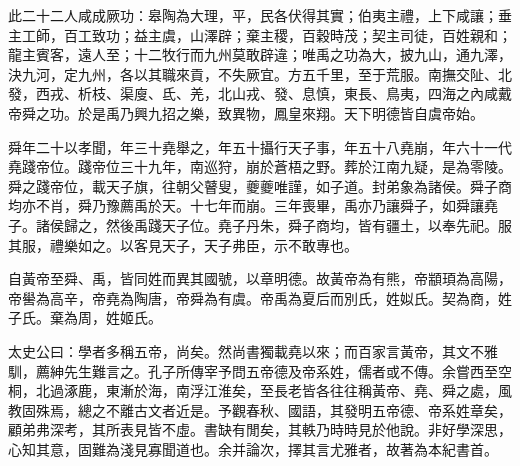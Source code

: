 \begin{pinyinscope}
此二十二人咸成厥功：皋陶為大理，平，民各伏得其實；伯夷主禮，上下咸讓；垂主工師，百工致功；益主虞，山澤辟；棄主稷，百穀時茂；契主司徒，百姓親和；龍主賓客，遠人至；十二牧行而九州莫敢辟違；唯禹之功為大，披九山，通九澤，決九河，定九州，各以其職來貢，不失厥宜。方五千里，至于荒服。南撫交阯、北發，西戎、析枝、渠廋、氐、羌，北山戎、發、息慎，東長、鳥夷，四海之內咸戴帝舜之功。於是禹乃興九招之樂，致異物，鳳皇來翔。天下明德皆自虞帝始。

舜年二十以孝聞，年三十堯舉之，年五十攝行天子事，年五十八堯崩，年六十一代堯踐帝位。踐帝位三十九年，南巡狩，崩於蒼梧之野。葬於江南九疑，是為零陵。舜之踐帝位，載天子旗，往朝父瞽叟，夔夔唯謹，如子道。封弟象為諸侯。舜子商均亦不肖，舜乃豫薦禹於天。十七年而崩。三年喪畢，禹亦乃讓舜子，如舜讓堯子。諸侯歸之，然後禹踐天子位。堯子丹朱，舜子商均，皆有疆土，以奉先祀。服其服，禮樂如之。以客見天子，天子弗臣，示不敢專也。

自黃帝至舜、禹，皆同姓而異其國號，以章明德。故黃帝為有熊，帝顓頊為高陽，帝嚳為高辛，帝堯為陶唐，帝舜為有虞。帝禹為夏后而別氏，姓姒氏。契為商，姓子氏。棄為周，姓姬氏。

太史公曰：學者多稱五帝，尚矣。然尚書獨載堯以來；而百家言黃帝，其文不雅馴，薦紳先生難言之。孔子所傳宰予問五帝德及帝系姓，儒者或不傳。余嘗西至空桐，北過涿鹿，東漸於海，南浮江淮矣，至長老皆各往往稱黃帝、堯、舜之處，風教固殊焉，總之不離古文者近是。予觀春秋、國語，其發明五帝德、帝系姓章矣，顧弟弗深考，其所表見皆不虛。書缺有閒矣，其軼乃時時見於他說。非好學深思，心知其意，固難為淺見寡聞道也。余并論次，擇其言尤雅者，故著為本紀書首。


\end{pinyinscope}